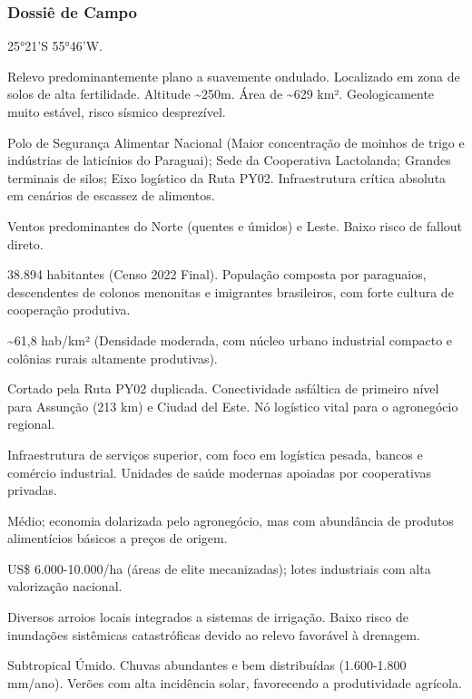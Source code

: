 \subsubsection{Dossiê de Campo}
\begin{description}[style=nextline,leftmargin=0.5cm,font=\bfseries]
\item[Coordenadas]  25°21'S 55°46'W.
\item[Topografia]  Relevo predominantemente plano a suavemente ondulado. Localizado em zona de solos de alta fertilidade. Altitude \textasciitilde 250m. Área de \textasciitilde 629 km². Geologicamente muito estável, risco sísmico desprezível.
\item[Alvos Estratégicos]  Polo de Segurança Alimentar Nacional (Maior concentração de moinhos de trigo e indústrias de laticínios do Paraguai); Sede da Cooperativa Lactolanda; Grandes terminais de silos; Eixo logístico da Ruta PY02. Infraestrutura crítica absoluta em cenários de escassez de alimentos.
\item[Fallout]  Ventos predominantes do Norte (quentes e úmidos) e Leste. Baixo risco de fallout direto.
\item[População]  38.894 habitantes (Censo 2022 Final). População composta por paraguaios, descendentes de colonos menonitas e imigrantes brasileiros, com forte cultura de cooperação produtiva.
\item[Densidade]  \textasciitilde 61,8 hab/\allowbreak km² (Densidade moderada, com núcleo urbano industrial compacto e colônias rurais altamente produtivas).
\item[Vias de Acesso]  Cortado pela Ruta PY02 duplicada. Conectividade asfáltica de primeiro nível para Assunção (213 km) e Ciudad del Este. Nó logístico vital para o agronegócio regional.
\item[Serviços]  Infraestrutura de serviços superior, com foco em logística pesada, bancos e comércio industrial. Unidades de saúde modernas apoiadas por cooperativas privadas.
\item[Custo de Vida]  Médio; economia dolarizada pelo agronegócio, mas com abundância de produtos alimentícios básicos a preços de origem.
\item[Preço da Terra]  US\$ 6.000-10.000/\allowbreak ha (áreas de elite mecanizadas); lotes industriais com alta valorização nacional.
\item[Hidrologia]  Diversos arroios locais integrados a sistemas de irrigação. Baixo risco de inundações sistêmicas catastróficas devido ao relevo favorável à drenagem.
\item[Clima]  Subtropical Úmido. Chuvas abundantes e bem distribuídas (1.600-1.800 mm/\allowbreak ano). Verões com alta incidência solar, favorecendo a produtividade agrícola.

\end{description}
